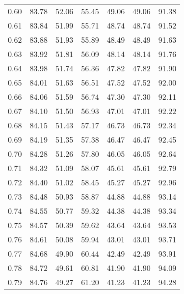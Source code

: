 \begin{tabular}{|c|c|c|c|c|c|c|}
      0.60 &     83.78 &     52.06 &      55.45 &   49.06 &      49.06 &         91.38 \\
      0.61 &     83.84 &     51.99 &      55.71 &   48.74 &      48.74 &         91.52 \\
      0.62 &     83.88 &     51.93 &      55.89 &   48.49 &      48.49 &         91.63 \\
      0.63 &     83.92 &     51.81 &      56.09 &   48.14 &      48.14 &         91.76 \\
      0.64 &     83.98 &     51.74 &      56.36 &   47.82 &      47.82 &         91.90 \\
      0.65 &     84.01 &     51.63 &      56.51 &   47.52 &      47.52 &         92.00 \\
      0.66 &     84.06 &     51.59 &      56.74 &   47.30 &      47.30 &         92.11 \\
      0.67 &     84.10 &     51.50 &      56.93 &   47.01 &      47.01 &         92.22 \\
      0.68 &     84.15 &     51.43 &      57.17 &   46.73 &      46.73 &         92.34 \\
      0.69 &     84.19 &     51.35 &      57.38 &   46.47 &      46.47 &         92.45 \\
      0.70 &     84.28 &     51.26 &      57.80 &   46.05 &      46.05 &         92.64 \\
      0.71 &     84.32 &     51.09 &      58.07 &   45.61 &      45.61 &         92.79 \\
      0.72 &     84.40 &     51.02 &      58.45 &   45.27 &      45.27 &         92.96 \\
      0.73 &     84.48 &     50.93 &      58.87 &   44.88 &      44.88 &         93.14 \\
      0.74 &     84.55 &     50.77 &      59.32 &   44.38 &      44.38 &         93.34 \\
      0.75 &     84.57 &     50.39 &      59.62 &   43.64 &      43.64 &         93.53 \\
      0.76 &     84.61 &     50.08 &      59.94 &   43.01 &      43.01 &         93.71 \\
      0.77 &     84.68 &     49.90 &      60.44 &   42.49 &      42.49 &         93.91 \\
      0.78 &     84.72 &     49.61 &      60.81 &   41.90 &      41.90 &         94.09 \\
      0.79 &     84.76 &     49.27 &      61.20 &   41.23 &      41.23 &         94.28 \\

\end{tabular}
